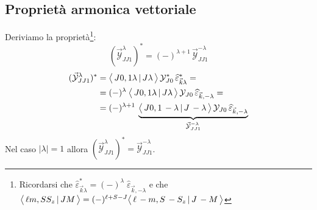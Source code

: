 \subsection{Proprietà armonica vettoriale}\label{compl-passaggi-armonica}
Deriviamo la proprietà\footnote{Ricordarsi che $\widehat{\varepsilon}_{\vec{k}\lambda}^* = (-)^\lambda \; \widehat{\varepsilon}_{\vec{k},-\lambda}$ e che $\bigl\langle\, \ell m, S S_z\, |\, J M\, \bigr\rangle = (-)^{\ell+S-J} \bigl\langle\, \ell\, -m, S\, -S_z\, |\, J \,-M\, \bigr\rangle $}:
$$(\vec{\mathcal{Y}}_{JJ1}^\lambda)^* = (-)^{\lambda+1}\,\vec{\mathcal{Y}}^{-\lambda}_{JJ1}$$
\begin{align*}
	(\vec{\mathcal{Y}}_{JJ1}^\lambda)^* &= \bigl\langle\, J0,1\lambda\, |\, J\lambda\, \bigr\rangle \, \mathcal{Y}_{J0}^* \, \widehat{\varepsilon}_{\vec{k}\lambda}^* = \\
	&= (-)^\lambda \: \bigl\langle\, J0,1\lambda\, |\, J\lambda\, \bigr\rangle \, \mathcal{Y}_{J0} \, \widehat{\varepsilon}_{\vec{k},-\lambda} = \\
	&= (-)^{\lambda+1} \: \underbrace{\bigl\langle\, J0,1\,-\lambda\, |\, J\,-\lambda\, \bigr\rangle \, \mathcal{Y}_{J0} \, \widehat{\varepsilon}_{\vec{k},-\lambda}}_{\vec{\mathcal{Y}}_{JJ1}^{-\lambda}}
\end{align*}
Nel caso $|\lambda|=1$ allora $(\vec{\mathcal{Y}}_{JJ1}^\lambda)^* = \vec{\mathcal{Y}}_{JJ1}^{-\lambda}$.

